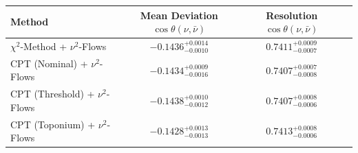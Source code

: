     \begin{tabular}{lccc}
        \toprule
        Method & Mean Deviation $\cos\theta(\nu, \bar{\nu})$ & Resolution $\cos\theta(\nu, \bar{\nu})$ \\
        \midrule
        $\chi^2$-Method + $\nu^2$-Flows & $-0.1436^{+0.0014}_{-0.0010}$ & $0.7411^{+0.0009}_{-0.0007}$ \\
        CPT (Nominal) + $\nu^2$-Flows & $-0.1434^{+0.0009}_{-0.0016}$ & $0.7407^{+0.0007}_{-0.0008}$ \\
        CPT (Threshold) + $\nu^2$-Flows & $-0.1438^{+0.0010}_{-0.0012}$ & $0.7407^{+0.0008}_{-0.0006}$ \\
        CPT (Toponium) + $\nu^2$-Flows & $-0.1428^{+0.0013}_{-0.0013}$ & $0.7413^{+0.0008}_{-0.0006}$ \\
        \bottomrule
    \end{tabular}